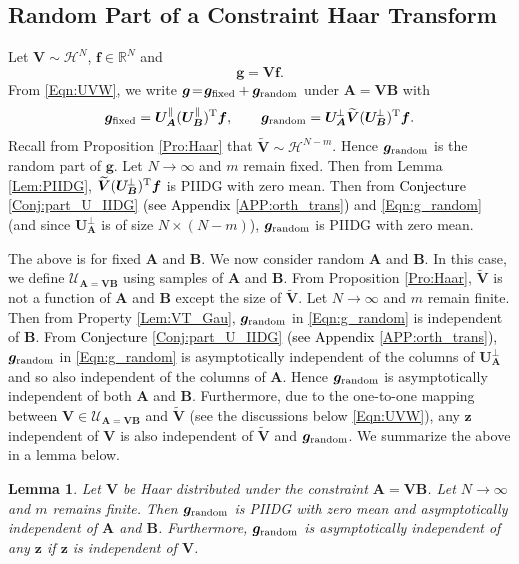 \documentclass[journal]{IEEEtran}
\newcommand{\BE}{\begin{equation}}
\newcommand{\EE}{\end{equation}}
\renewcommand{\bf}{\bm}
\newcommand{\bb}{\mathbb}
\renewcommand{\cal}{\mathcal}
\newtheorem{lemma}[theorem]{Lemma}
\newcommand{\LL}[1]{\textcolor{black}{#1}}
\begin{document}
\subsection{Random Part of a Constraint Haar Transform}
Let $\bf{V}\sim \bf{\cal{H}}^N$, $\bf{f}\in \bb{R}^N$ and
\BE
    \bf{g}=\bf{Vf}.
\EE
From \eqref{Eqn:UVW}, we  write $\bf{g}\!=\!\bf{g}_{\rm fixed} + \bf{g}_{\rm random}$ under $\bf{A}\!=\!\bf{VB}$ with 
 \begin{align}\label{Eqn:g_random}
    \bf{g}_{\rm fixed} = \bf{U}_{\bf{A}}^\parallel(\bf{U}_{\bf{B}}^\parallel)^{\rm T}\bf{f}, \qquad
    \bf{g}_{\rm random} = \bf{U}_{\bf{A}}^{\!\perp}\widetilde{\bf{V}} (\bf{U}_{\bf{B}}^{\!\perp})^{\rm T} \bf{f}.
\end{align} 
Recall from Proposition \ref{Pro:Haar} that $\widetilde{\bf{V}}\sim\bf{\cal{H}}^{N-m}$. Hence $\bf{g}_{\rm random}$ is the random part of $\bf{g}$. Let $N\to\infty$ and $m$ remain fixed. Then from Lemma \ref{Lem:PIIDG}, $\widetilde{\bf{V}} (\bf{U}_{\bf{B}}^{\!\perp})^{\rm T} \bf{f}$ is PIIDG with zero mean. Then from \LL{Conjecture \ref{Conj:part_U_IIDG} (see Appendix \ref{APP:orth_trans})} and \eqref{Eqn:g_random} (and since $\bf{U}_{\bf{A}}^{\!\perp}$ is of size $N\times (N-m)$), $\bf{g}_{\rm random}$ is PIIDG with zero mean. 

The above is for fixed $\bf{A}$ and $\bf{B}$. We now consider random $\bf{A}$ and $\bf{B}$. In this case, we define $\bf{\cal{U}}_{\bf{A}=\bf{VB}}$ using samples of $\bf{A}$ and $\bf{B}$. From Proposition \ref{Pro:Haar}, $\widetilde{\bf{V}}$  is not a function of $\bf{A}$ and $\bf{B}$ except the size of $\widetilde{\bf{V}}$. Let $N\to\infty$ and $m$ remain finite. Then from Property \ref{Lem:VT_Gau},  $\bf{g}_{\rm random}$ in \eqref{Eqn:g_random} is independent of $\bf{B}$. From \LL{Conjecture \ref{Conj:part_U_IIDG} (see Appendix \ref{APP:orth_trans})}, $\bf{g}_{\rm random}$ in \eqref{Eqn:g_random} is asymptotically independent of the columns of $\bf{U}_{\bf{A}}^{\!\perp}$ and so also independent of the columns of $\bf{A}$.  Hence $\bf{g}_{\rm random}$ is asymptotically independent of both $\bf{A}$ and $\bf{B}$. Furthermore, due to the one-to-one mapping between $\bf{V}\in\bf{\cal{U}}_{\bf{A}=\bf{VB}}$ and $\widetilde{\bf{V}}$  (see the discussions below \eqref{Eqn:UVW}), any $\bf{z}$ independent of $\bf{V}$ is also independent of $\widetilde{\bf{V}}$  and $\bf{g}_{\rm random}$. We summarize the above in a lemma below.

\begin{lemma}\label{Lem:Cond_Haar_IIDG}
    Let $\bf{V}$ be Haar distributed under the constraint $\bf{A}=\bf{VB}$. Let $N\to \infty$ and $m$ remains finite. Then $\bf{g}_{\rm random}$ is PIIDG with zero mean and asymptotically independent of $\bf{A}$ and $\bf{B}$. Furthermore, $\bf{g}_{\rm random}$ is asymptotically independent of any $\bf{z}$ if $\bf{z}$ is independent of $\bf{V}$. 
\end{lemma}
\end{document}
